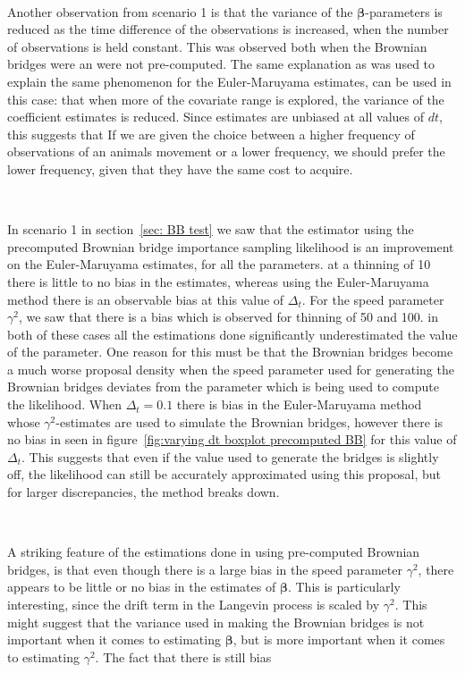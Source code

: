 \

Another observation from scenario 1 is that the variance of the $\bm \beta$-parameters is reduced as the time difference of the observations is increased, when the number of observations is held constant. This was observed both when the Brownian bridges were an were not pre-computed. The same explanation as was used to explain the same phenomenon for the Euler-Maruyama estimates, can be used in this case: that when more of the covariate range is explored, the variance of the coefficient estimates is reduced. Since estimates are unbiased at all values of $dt$, this suggests that If we are given the choice between a higher frequency of observations of an animals movement or a lower frequency, we should prefer the lower frequency, given that they have the same cost to acquire.

\

In scenario 1 in section~\ref{sec: BB test} we saw that the estimator using the precomputed Brownian bridge importance sampling likelihood is an improvement on the Euler-Maruyama estimates, for all the parameters. at a thinning of 10 there is little to no bias in the estimates, whereas using the Euler-Maruyama method there is an observable bias at this value of $\Delta_t$. For the speed parameter $\gamma^2$, we saw that there is a bias which is observed for thinning of 50 and 100. in both of these cases all the estimations done significantly underestimated the value of the parameter. One reason for this must be that the Brownian bridges become a much worse proposal density when the speed parameter used for generating the Brownian bridges deviates from the parameter which is being used to compute the likelihood. 
When $\Delta_t=0.1$ there is bias in the Euler-Maruyama method whose $\gamma^2$-estimates are used to simulate the Brownian bridges, however there is no bias in seen in figure~\ref{fig:varying dt boxplot precomputed BB} for this value of $\Delta_t$. This suggests that even if the value used to generate the bridges is slightly off, the likelihood can still be accurately approximated using this proposal, but for larger discrepancies, the method breaks down. 


\

A striking feature of the estimations done in using pre-computed Brownian bridges, is that even though there is a large bias in the speed parameter $\gamma^2$, there appears to be little or no bias in the estimates of $\bm \beta$. This is particularly interesting, since the drift term in the Langevin process is scaled by $\gamma^2$. This might suggest that the variance used in making the Brownian bridges is not important when it comes to estimating $\bm \beta$, but is more important when it comes to estimating $\gamma^2$. The fact that there is still bias 




